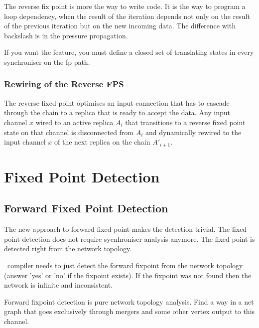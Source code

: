 The reverse fix point is more the way to write code. It is the way to program a loop dependency, when the result of the iteration depends not only on the result of the previous iteration but on the new incoming data. The difference with backslash is in the pressure propagation.

If you want the feature, you must define a closed set of translating states in every synchroniser on the fp path.


\subsubsection{Rewiring of the Reverse FPS}
The reverse fixed point optimises an input connection that has to cascade through the chain to a replica that is ready to accept the data. Any input channel $x$ wired to an active replica $A_i$ that transitions to a reverse fixed point state on that channel is disconnected from $A_i$ and dynamically rewired to the input channel $x$ of the next replica on the chain $A'_{i+1}$.


    \section{Fixed Point Detection\label{fp_detect}}

    \subsection{Forward Fixed Point Detection\label{ffp_detect}}
The new approach to forward fixed point makes the detection trivial. The fixed point detection does not require sycnhroniser analysis anymore. The fixed point is detected right from the network topology.

\ak\ compiler needs to just detect the forward fixpoint from the network topology (answer 'yes' or 'no' if the fixpoint exists). If the fixpoint was not found then the network is infinite and inconsistent.

Forward fixpoint detection is pure network topology analysis. Find a way in a net graph that goes exclusively through mergers and some other vertex output to this channel.

